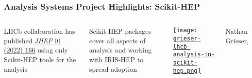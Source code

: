 \begin{frame}
  \frametitle{Analysis Systems Project Highlights: Scikit-HEP}
\vspace{0.25 cm}
\begin{columns}

LHCb collaboration has published \href{https://inspirehep.net/literature/1889335}{\textit{JHEP} 01 (2022) 166} using only Scikit-HEP tools for the analysis

\vspace{0.75 cm}
Scikit-HEP packages cover all aspects of analysis and working with IRIS-HEP to spread adoption

\href{https://indico.cern.ch/event/1126109/contributions/4780169/}{\texttt{[image: grieser-lhcb-analysis-in-scikit-hep.png]}}
\vspace{-5pt}
\begin{center}
  Nathan Grieser, 
\end{center}
\end{columns}
\end{frame}

